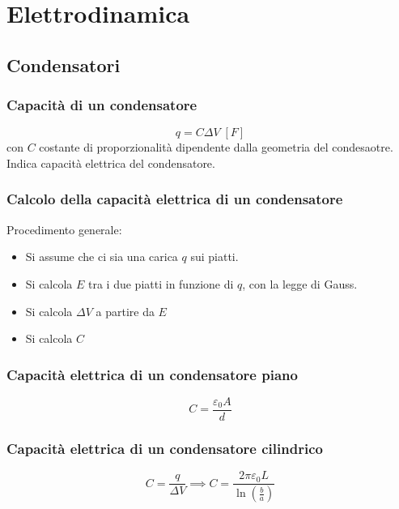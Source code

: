 \chapter*{Elettrodinamica}

    \section*{Condensatori}
        \subsection*{Capacità di un condensatore}
            \begin{equation*}
                q = C\Delta V\;[F]
            \end{equation*}
        con $C$ costante di proporzionalità dipendente dalla geometria del 
        condesaotre. Indica capacità elettrica del condensatore.
        
        \subsection*{Calcolo della capacità elettrica di un condensatore} 
        Procedimento generale:
            \begin{itemize}
                \item Si assume che ci sia una carica $q$ sui piatti.
                \item Si calcola $E$ tra i due piatti in funzione di $q$, con 
                la legge di Gauss.
                \item Si calcola $\Delta V$ a partire da $E$
                \item Si calcola $C$
            \end{itemize}
        
        \subsection*{Capacità elettrica di un condensatore piano}
            \begin{equation*}
                C = \frac{\varepsilon_0A}{d}
            \end{equation*}

        \subsection*{Capacità elettrica di un condensatore cilindrico}
            \begin{equation*}
                C = \frac{q}{\Delta V} \implies C = \frac{2\pi\varepsilon_0L}
                {\ln(\frac{b}{a})}
            \end{equation*}

